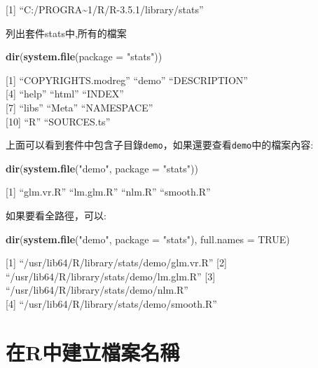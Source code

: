 \documentclass[]{book}
\newenvironment{Shaded}{\begin{snugshade}}{\end{snugshade}}
\newcommand{\DataTypeTok}[1]{\textcolor[rgb]{0.13,0.29,0.53}{#1}}
\newcommand{\KeywordTok}[1]{\textcolor[rgb]{0.13,0.29,0.53}{\textbf{#1}}}
\newcommand{\NormalTok}[1]{#1}
\newcommand{\OtherTok}[1]{\textcolor[rgb]{0.56,0.35,0.01}{#1}}
\newcommand{\StringTok}[1]{\textcolor[rgb]{0.31,0.60,0.02}{#1}}
\theoremstyle{definition}
\theoremstyle{definition}
\theoremstyle{definition}
\theoremstyle{remark}
\begin{document}
{[}1{]} ``C:/PROGRA\textasciitilde{}1/R/R-3.5.1/library/stats''

列出套件stats中,所有的檔案

\begin{Shaded}
\begin{Highlighting}[]
\KeywordTok{dir}\NormalTok{(}\KeywordTok{system.file}\NormalTok{(}\DataTypeTok{package =} \StringTok{"stats"}\NormalTok{))}
\end{Highlighting}
\end{Shaded}

{[}1{]} ``COPYRIGHTS.modreg'' ``demo'' ``DESCRIPTION''\\
{[}4{]} ``help'' ``html'' ``INDEX''\\
{[}7{]} ``libs'' ``Meta'' ``NAMESPACE''\\
{[}10{]} ``R'' ``SOURCES.ts''

上面可以看到套件中包含子目錄\texttt{demo}，如果還要查看\texttt{demo}中的檔案內容:

\begin{Shaded}
\begin{Highlighting}[]
\KeywordTok{dir}\NormalTok{(}\KeywordTok{system.file}\NormalTok{(}\StringTok{"demo"}\NormalTok{, }\DataTypeTok{package =} \StringTok{"stats"}\NormalTok{))}
\end{Highlighting}
\end{Shaded}

{[}1{]} ``glm.vr.R'' ``lm.glm.R'' ``nlm.R'' ``smooth.R''

如果要看全路徑，可以:

\begin{Shaded}
\begin{Highlighting}[]
\KeywordTok{dir}\NormalTok{(}\KeywordTok{system.file}\NormalTok{(}\StringTok{"demo"}\NormalTok{, }\DataTypeTok{package =} \StringTok{"stats"}\NormalTok{), }\DataTypeTok{full.names =} \OtherTok{TRUE}\NormalTok{)}
\end{Highlighting}
\end{Shaded}

{[}1{]} ``/usr/lib64/R/library/stats/demo/glm.vr.R'' {[}2{]}
``/usr/lib64/R/library/stats/demo/lm.glm.R'' {[}3{]}
``/usr/lib64/R/library/stats/demo/nlm.R''\\
{[}4{]} ``/usr/lib64/R/library/stats/demo/smooth.R''

\hypertarget{r}{%
\section{在R中建立檔案名稱}\label{r}}
\end{document}
